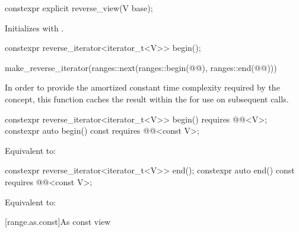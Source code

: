 %
\begin{itemdecl}
constexpr explicit reverse_view(V base);
\end{itemdecl}

\begin{itemdescr}
\pnum
\effects
Initializes  with .
\end{itemdescr}

%
\begin{itemdecl}
constexpr reverse_iterator<iterator_t<V>> begin();
\end{itemdecl}

\begin{itemdescr}
\pnum
\returns
\begin{codeblock}
make_reverse_iterator(ranges::next(ranges::begin(@@), ranges::end(@@)))
\end{codeblock}

\pnum
\remarks
In order to provide the amortized constant time complexity required by
the  concept, this function caches the result within the
 for use on subsequent calls.
\end{itemdescr}

%
\begin{itemdecl}
constexpr reverse_iterator<iterator_t<V>> begin() requires @@<V>;
constexpr auto begin() const requires @@<const V>;
\end{itemdecl}

\begin{itemdescr}
\pnum
\effects
Equivalent to: 
\end{itemdescr}

%
\begin{itemdecl}
constexpr reverse_iterator<iterator_t<V>> end();
constexpr auto end() const requires @@<const V>;
\end{itemdecl}

\begin{itemdescr}
\pnum
\effects
Equivalent to: 
\end{itemdescr}

[range.as.const]{As const view}


